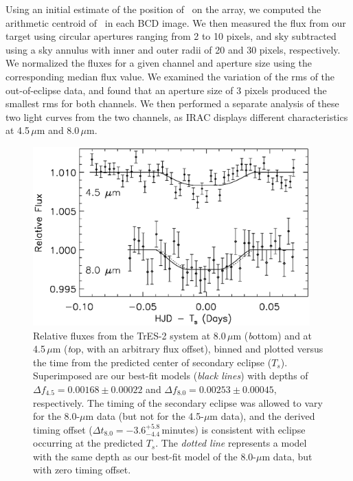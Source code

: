 Using an initial estimate of the position of \tresTwo\ on the array, we computed the arithmetic centroid of \tresTwo\ in each BCD image.
We then measured the flux from our target using circular apertures ranging from 2 to 10 pixels, and sky subtracted using a sky annulus with inner and outer radii of 20 and 30 pixels, respectively.
We normalized the fluxes for a given channel and aperture size using the corresponding median flux value.
We examined the variation of the rms of the out-of-eclipse data, and found that an aperture size of 3 pixels produced the smallest rms for both channels.
We then performed a separate analysis of these two light curves from the two channels, as IRAC displays different characteristics at 4.5\,$\mu$m and 8.0\,$\mu$m.

\begin{figure}
\begin{center}
\includegraphics[width=0.95\textwidth]{6_f1}
\caption[%
Near-infrared relative fluxes from TrES-2 from {\textit Spitzer} observations]{%
Relative fluxes from the TrES-2 system at 8.0\,$\mu$m ({\textit bottom}) and at 4.5\,$\mu$m ({\textit top}, with an arbitrary flux offset), binned and plotted versus the time from the predicted center of secondary eclipse ($T_{s}$).
Superimposed are our best-fit models (\emph{black lines}) with depths of \mbox{$\Delta f_{\mathrm {4.5}} = 0.00168 \pm 0.00022$} and \mbox{$\Delta f_{\mathrm {8.0}} = 0.00253 \pm 0.00045$}, respectively.
The timing of the secondary eclipse was allowed to vary for the 8.0-$\mu$m data (but not for the 4.5-$\mu$m data), and the derived timing offset (\mbox{$\Delta t_{\mathrm {8.0}} = -3.6^{+5.8}_{-4.4}$\,minutes}) is consistent with eclipse occurring at the predicted $T_{s}$.
The \emph{dotted line} represents a model with the same depth as our best-fit model of the 8.0-$\mu$m data, but with zero timing offset.%
}\label{cha:spitzer:fig:tres2_combplot}
\end{center}
\end{figure}

